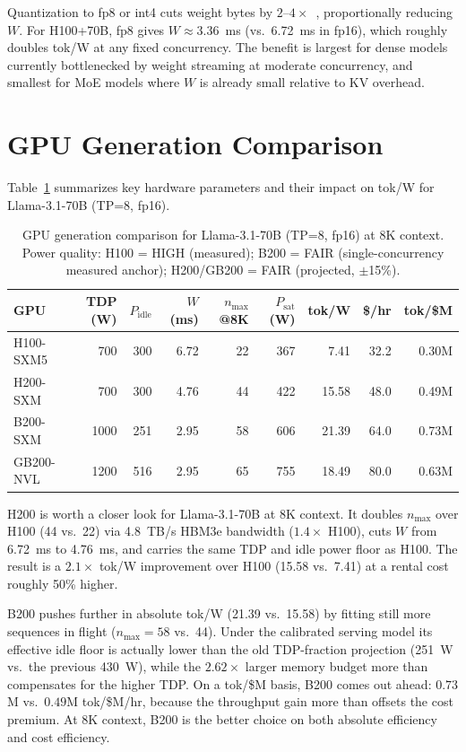 \documentclass[11pt,a4paper]{article}
\newcommand{\nmax}{n_{\max}}
\newcommand{\Pidle}{P_{\text{idle}}}
\begin{document}
Quantization to fp8 or int4 cuts weight bytes by $2$--$4\times$~\citep{micikevicius2022fp8,frantar2022gptq},
proportionally reducing $W$.  For H100+70B, fp8 gives $W \approx 3.36$~ms
(vs.\ 6.72~ms in fp16), which roughly doubles tok/W at any fixed concurrency.
The benefit is largest for dense models currently bottlenecked by weight
streaming at moderate concurrency, and smallest for MoE models where $W$ is
already small relative to KV overhead.

\section{GPU Generation Comparison}
\label{sec:gen-compare}

Table~\ref{tab:gen-compare} summarizes key hardware parameters and their
impact on tok/W for Llama-3.1-70B (TP=8, fp16).

\begin{table}[htbp]
\centering
\caption{GPU generation comparison for Llama-3.1-70B (TP=8, fp16) at 8K context.
  Power quality: H100 = HIGH (measured); B200 = FAIR (single-concurrency measured
  anchor); H200/GB200 = FAIR (projected, $\pm$15\%).}
\label{tab:gen-compare}
\small
\begin{tabular}{lrrrrrrrr}
\toprule
GPU & TDP (W) & $\Pidle$ & $W$ (ms) & $\nmax$@8K & $P_{\text{sat}}$ (W) &
  tok/W & \$/hr & tok/\$M \\
\midrule
H100-SXM5 &  700 & 300 & 6.72 &  22 &  367 &  7.41 & 32.2 &  0.30M \\
H200-SXM  &  700 & 300 & 4.76 &  44 &  422 & 15.58 & 48.0 &  0.49M \\
B200-SXM  & 1000 & 251 & 2.95 &  58 &  606 & 21.39 & 64.0 &  0.73M \\
GB200-NVL & 1200 & 516 & 2.95 &  65 &  755 & 18.49 & 80.0 &  0.63M \\
\bottomrule
\end{tabular}
\end{table}

H200 is worth a closer look for Llama-3.1-70B at 8K context.
It doubles $\nmax$ over H100 (44 vs.\ 22) via 4.8~TB/s HBM3e bandwidth
($1.4\times$ H100), cuts $W$ from 6.72~ms to 4.76~ms, and carries the same
TDP and idle power floor as H100.  The result is a $2.1\times$ tok/W
improvement over H100 (15.58 vs.\ 7.41) at a rental cost roughly 50\% higher.

B200 pushes further in absolute tok/W (21.39 vs.\ 15.58) by fitting still
more sequences in flight ($\nmax = 58$ vs.\ 44).  Under the calibrated serving
model its effective idle floor is actually lower than the old TDP-fraction
projection (251~W vs.\ the previous 430~W), while the $2.62\times$ larger memory
budget more than compensates for the higher TDP.  On a tok/\$M basis, B200 comes out ahead:
$0.73$M vs.\ $0.49$M tok/\$M/hr, because the throughput gain more than
offsets the cost premium.  At 8K context, B200 is the better choice on
both absolute efficiency and cost efficiency.
\end{document}
